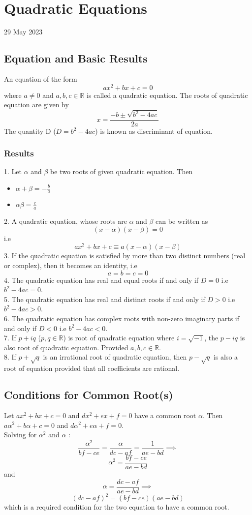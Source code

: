 \documentclass[12pt]{article}
\begin{document}
\section{Quadratic Equations}
29 May 2023
\subsection{Equation and Basic Results}
An equation of the form $$ax^2+bx+c=0$$ where $a \not= 0$ and $a,b,c \in \mathbb{R}$ is called a quadratic equation. The roots of quadratic equation are given by $$x=\frac{-b \pm \sqrt{b^2-4ac}}{2a}$$ The quantity D ($D=b^2-4ac$) is known as discriminant of equation.
\subsubsection{Results}
1. Let $\alpha$ and $\beta$ be two roots of given quadratic equation. Then

\begin{itemize}
\item $\alpha + \beta = -\frac{b}{a}$
\item $\alpha \beta=\frac{c}{a}$
\end{itemize}
2. A quadratic equation, whose roots are $\alpha$ and $\beta$ can be written as $$(x-\alpha)(x-\beta)=0$$ i.e $$ax^2+bx+c \equiv a(x-\alpha)(x-\beta)$$
3. If the quadratic equation is satisfied by more than two distinct numbers (real or complex), then it becomes an identity, i.e $$a=b=c=0$$
4. The quadratic equation has real and equal roots if and only if $D=0$ i.e $b^2-4ac=0$. \\
5. The quadratic equation has real and distinct roots if and only if $D>0$ i.e $b^2-4ac>0$. \\
6. The quadratic equation has complex roots with non-zero imaginary parts if and only if $D<0$ i.e $b^2-4ac<0$.\\
7. If $p+iq$ ($p,q \in \mathbb{R}$) is root of quadratic equation where $i=\sqrt{-1}$, the $p-iq$ is also root of quadratic equation. Provided $a,b,c \in \mathbb{R}$. \\
8. If $p+\sqrt{q}$ is an irrational root of quadratic equation, then $p-\sqrt{q}$ is also a root of equation provided that all coefficients are rational.
\subsection{Conditions for Common Root(s)}
Let $ax^2+bx+c=0$ and $dx^2+ex+f=0$ have a common root $\alpha$. Then 
$a\alpha ^{2}+b\alpha+c=0$ and $d\alpha ^{2}+e\alpha+f=0$.\\
Solving for $ \alpha^2$ and $ \alpha$ :
$$\frac{\alpha^2}{bf-ce}=\frac{\alpha}{dc-af}=\frac{1}{ae-bd} \implies$$ $$\alpha^2=\frac{bf-ce}{ae-bd}$$ and $$\alpha=\frac{dc-af}{ae-bd} \implies$$ $$(dc-af)^2=(bf-ce)(ae-bd)$$
which is a required condition for the two equation to have a common root.
\end{document}
